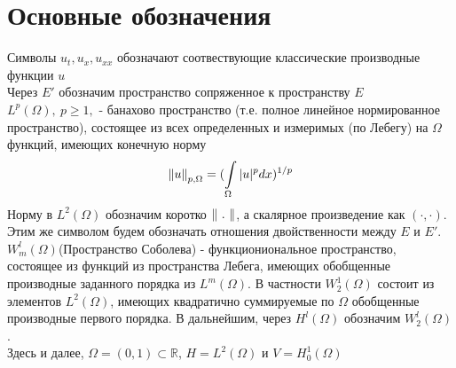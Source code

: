 \section*{Основные обозначения}
\vspace{3em}

Символы $u_t, u_x, u_{xx}$ обозначают соотвествующие классические
производные функции $u$\\

Через $E'$ обозначим пространство сопряженное к пространству $E$\\

$L^{p}(\Omega), \ p \ge 1,$ - банахово пространство (т.е. полное линейное
нормированное пространство), состоящее из всех определенных и измеримых (по
Лебегу) на $\Omega$ функций, имеющих конечную норму
\begin{equation*}
    \left\lVert u\right\rVert_{p, \Omega} = (\int\limits_{\Omega}{|u|^p dx})^{1/p}
\end{equation*}
Норму в $L^2(\Omega)$ обозначим коротко $\left\lVert\ .\ \right\rVert$, а скалярное произведение
как $(\cdot,\cdot)$. Этим же символом будем обозначать отношения двойственности
между $E$ и $E'$.\\

$W^l_m(\Omega)$(Пространство Соболева) - функциониональное пространство,
состоящее из функций из пространства Лебега, имеющих обобщенные производные 
заданного порядка из $L^m(\Omega)$. В частности
$W^1_2(\Omega)$ состоит из элементов $L^2(\Omega)$, имеющих квадратично
суммируемые по $\Omega$ обобщенные производные первого порядка. В дальнейшим,
через $H^l(\Omega)$ обозначим $W^l_2(\Omega)$.\\

Здесь и далее, $\Omega = (0, 1) \subset \mathbb{R}$, $H = L^2(\Omega)$ и 
$V = H^1_0(\Omega)$


